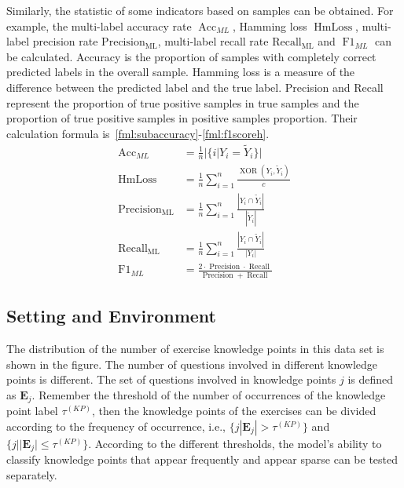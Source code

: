 Similarly, the statistic of some indicators based on samples can be obtained. For example, the multi-label accuracy rate \(\operatorname{Acc}_{ML}\), Hamming loss \(\operatorname{HmLoss}\), multi-label precision rate \(\operatorname{Precision_{ML}}\), multi-label recall rate \(\operatorname{Recall_{ML}}\) and \(\operatorname{F1}_{ML}\) can be calculated. Accuracy is the proportion of samples with completely correct predicted labels in the overall sample. Hamming loss is a measure of the difference between the predicted label and the true label. Precision and Recall represent the proportion of true positive samples in true samples and the proportion of true positive samples in positive samples proportion. Their calculation formula is~\ref{fml:subaccuracy}-\ref{fml:f1scoreh}.
\begin{align}
	\operatorname{Acc}_{ML}       & =\frac{1}{n} |\{i|Y_i=\tilde{Y}_i\}| \label{fml:subaccuracy}                                                                              \\
	\operatorname{HmLoss}         & =\frac{1}{n} \sum_{i=1}^{n} \frac{\operatorname{XOR}(Y_i,\tilde{Y}_i)}{c} \label{fml:hmloss}                                              \\
	\operatorname{Precision_{ML}} & =\frac{1}{n} \sum_{i=1}^{n} \frac{|Y_{i} \cap \tilde{Y}_i|}{|\tilde{Y}_i|} \label{fml:Precisionh}                                         \\
	\operatorname{Recall_{ML}}    & =\frac{1}{n} \sum_{i=1}^{n} \frac{|Y_{i} \cap \tilde{Y}_i|}{|Y_{i}|}    \label{fml:Recallh}                                               \\
	\operatorname{F1}_{ML}        & =\frac{2 \cdot \operatorname{Precision} \cdot \operatorname{Recall}}{\operatorname{Precision}+\operatorname{Recall}} \label{fml:f1scoreh}
\end{align}

\subsection{Setting and Environment}
The distribution of the number of exercise knowledge points in this data set is shown in the figure. The number of questions involved in different knowledge points is different. The set of questions involved in knowledge points \(j\) is defined as \(\mathbf{E}_j\). Remember the threshold of the number of occurrences of the knowledge point label \(\tau^{(KP)} \), then the knowledge points of the exercises can be divided according to the frequency of occurrence, i.e., \( \{j|\mathbf{E}_j|>\tau^{(KP)}\} \) and \( \{j||\mathbf{E}_j|\leq\tau^{(KP)} \} \). According to the different thresholds, the model's ability to classify knowledge points that appear frequently and appear sparse can be tested separately.

